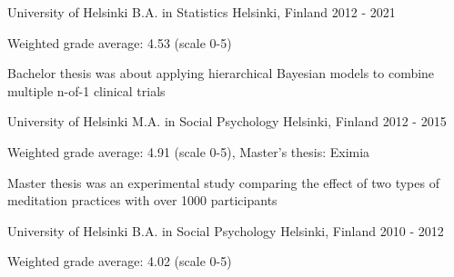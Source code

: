 

\begin{cventries}


  \cventry
    {University of Helsinki} %
    {B.A. in Statistics} %
    {Helsinki, Finland} %
    {2012 - 2021} %
    {
      \begin{cvitems} %
        \item {Weighted grade average: 4.53 (scale 0-5)}
        \item {Bachelor thesis was about applying hierarchical Bayesian models to
        combine multiple n-of-1 clinical trials}
      \end{cvitems}
    }

  \cventry
    {University of Helsinki} %
    {M.A. in Social Psychology} %
    {Helsinki, Finland} %
    {2012 - 2015} %
    {
      \begin{cvitems} %
        \item {Weighted grade average: 4.91 (scale 0-5), Master's thesis: Eximia}
        \item {Master thesis was an experimental study comparing the effect of two
        types of meditation practices with over 1000 participants}
      \end{cvitems}
    }

  \cventry
    {University of Helsinki} %
    {B.A. in Social Psychology} %
    {Helsinki, Finland} %
    {2010 - 2012} %
    {
      \begin{cvitems} %
        \item {Weighted grade average: 4.02 (scale 0-5)}
      \end{cvitems}
    }


\end{cventries}
